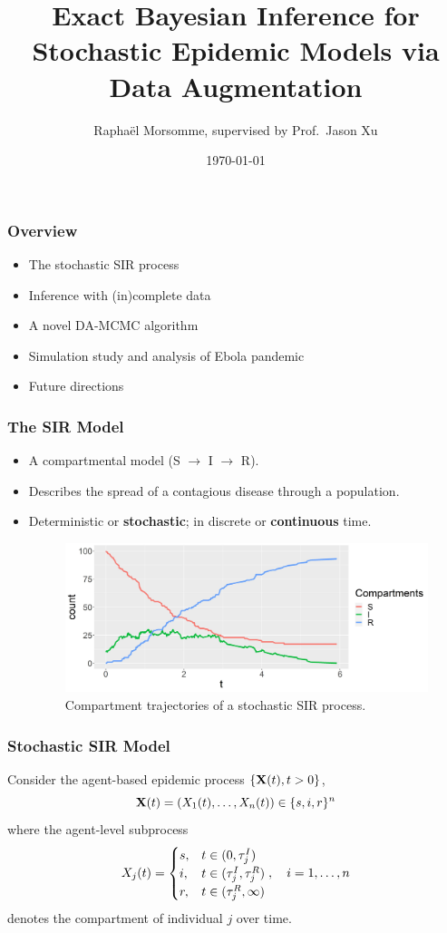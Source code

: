 \documentclass{beamer}
\title{Exact Bayesian Inference for Stochastic Epidemic Models via Data Augmentation}
\author{
	Rapha\"{e}l Morsomme, supervised by Prof.\ Jason Xu
}
\date{\today}
\begin{document}
\frame{\titlepage}



\begin{frame} \frametitle{Overview}
\begin{itemize}
	\item The stochastic SIR process
	\item Inference with (in)complete data
	\item A novel DA-MCMC algorithm
	\item Simulation study and analysis of Ebola pandemic
	\item Future directions
\end{itemize}
\end{frame}




\begin{frame} \frametitle{The SIR Model}  
	
	\begin{itemize}
		\item A compartmental model (S $\rightarrow$ I $\rightarrow$ R).
		\item Describes the spread of a contagious disease through a population.	
		\item Deterministic or \textbf{stochastic}; in discrete or \textbf{continuous} time.
		\vfill
		\begin{figure}
			\centering
			\includegraphics[scale = 0.2]{E3_S0=100_trajectories}
			\caption{Compartment trajectories of a stochastic SIR process.}
		\end{figure}
	\end{itemize}
	
\end{frame}


\begin{frame} \frametitle{Stochastic SIR Model}  

	Consider the agent-based epidemic process $\left\lbrace \mathbf{X}(t), t>0\right\rbrace$, 
	$$\mathbf{X}(t) = (X_1(t), \dots, X_n(t)) \in \{s, i, r\}^n$$
	where the agent-level subprocess
	$$ X_j(t) = 
	\begin{cases}
		s, & t \in (0, \tau^I_j) \\
		i, & t \in (\tau^I_j, \tau^R_j) \\
		r, & t \in (\tau^R_j, \infty)
	\end{cases}
	,\quad i=1,\dots,n
	$$
	denotes the compartment of individual $j$ over time.
	
\end{frame}
\end{document}

